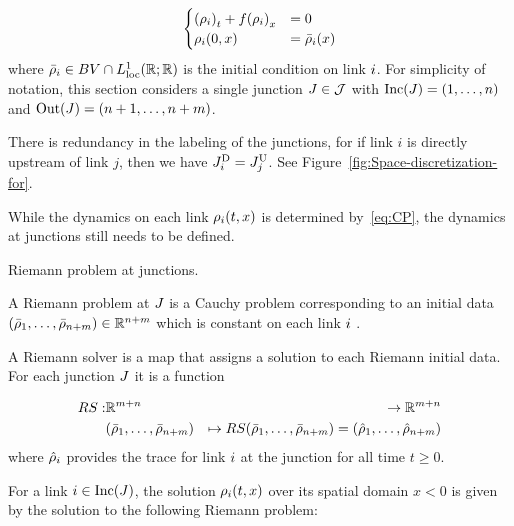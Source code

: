 \begin{equation}
	\begin{cases}
		\left(\cvar_{\link}\right)_{t}+f\left(\cvar_{\link}\right)_{x} & =0                                \\
		\cvar_{\link}\left(0,x\right)                                  & =\initstate_{\link}\left(x\right) 
	\end{cases}\label{eq:cauchy-i}
\end{equation}
where $\initstate_{\link}\in BV\cap L_{\text{loc}}^{1}\left(\mathbb{R};\mathbb{R}\right)$
is the initial condition on link $i$. For simplicity of notation,
this section considers a single junction $J\in\mathcal{J}$ with $\Inc\left(\jn\right)=\left(1,\ldots,\ninc\right)$
and $\Out\left(\jn\right)=\left(\ninc+1,\ldots,\ninc+\nout\right)$.
\begin{rem}
	There is redundancy in the labeling of the junctions, for if link
	$i$ is directly upstream of link $j$, then we have $J_{i}^{\text{D}}=J_{j}^{\text{U}}$.
	See Figure~\ref{fig:Space-discretization-for}.
\end{rem}
While the dynamics on each link $\cvar_{\link}\left(t,x\right)$ is
determined by~\eqref{eq:CP}, the dynamics at junctions
still needs to be defined.
\begin{defn}
	Riemann problem at junctions. 
		
	A Riemann problem at $J$ is a Cauchy problem corresponding to an initial data $\tuple{\initstate_{1}}{\initstate_{\ninc+\nout}}\in\mathbb{R}^{\ninc+\nout}$ which is constant on each link $i$ .
		
\end{defn}
\begin{defn}
	A Riemann solver is a map that assigns a solution to each Riemann initial data. For each junction $J$ it is a function
		
	\begin{eqnarray*}
		\RS: & \mathbb{R}^{m+n} & \rightarrow\mathbb{R}^{m+n}\\
		& \tuple{\initstate_{1}}{\initstate_{\ninc+\nout}} & \mapsto\RS\tuple{\initstate_{1}}{\initstate_{\ninc+\nout}}=\tuple{\trace{\cvar}_{1}}{\trace{\cvar}_{\ninc+\nout}}
	\end{eqnarray*}
	where $\hat{\rho}_{i}$ provides the trace for link $i$
	at the junction for all time $t\ge0$.
		
\end{defn}
For a link $i\in\Inc\left(\jn\right)$,
the solution $\cvar_{i}\left(t,x\right)$ over its spatial domain
$x<0$ is given by the solution to the following Riemann problem:

